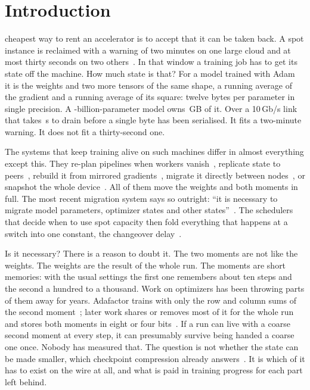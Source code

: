 \section{Introduction}
\label{sec:intro}

 cheapest way to rent an accelerator is to accept that it can be taken back. A spot instance is
reclaimed with a warning of two minutes on one large cloud and at most thirty seconds on two
others~\cite{wu2024cantbelate,lee2022spotlake}. In that window a training job has to get its state off the machine.
How much state is that? For a model trained with Adam~\cite{kingma2015adam,loshchilov2019adamw} it is the weights and
two more tensors of the same shape, a running average of the gradient and a running average of its square: twelve
bytes per parameter in single precision. A \llamaParams{}-billion-parameter model owns \llamaFullGB{}\,GB of it. Over
a 10\,Gb/s link that takes \llamaFullDrain{}\,s to drain before a single byte has been serialised. It fits a two-minute
warning. It does not fit a thirty-second one.

The systems that keep training alive on such machines differ in almost everything except this. They re-plan pipelines
when workers vanish~\cite{athlur2022varuna,thorpe2023bamboo,jang2023oobleck,duan2024parcae}, replicate state to
peers~\cite{wang2023gemini}, rebuild it from mirrored gradients~\cite{bhardwaj2025checkmate}, migrate it directly
between nodes~\cite{liu2026etc}, or snapshot the whole device~\cite{stoyanov2025criugpu,wei2025phoenixos}. All of them
move the weights and both moments in full. The most recent migration system says so outright: ``it is necessary to
migrate model parameters, optimizer states and other states''~\cite{liu2026etc}. The schedulers that decide when to
use spot capacity then fold everything that happens at a switch into one constant, the changeover
delay~\cite{wu2024cantbelate}.

Is it necessary? There is a reason to doubt it. The two moments are not like the weights. The weights are the result
of the whole run. The moments are short memories: with the usual settings the first one remembers about ten steps and
the second a hundred to a thousand. Work on optimizers has been throwing parts of them away for years. Adafactor
trains with only the row and column sums of the second moment~\cite{shazeer2018adafactor}; later work shares or
removes most of it for the whole run~\cite{zhang2025adammini,kalra2025slimadam} and stores both moments in eight or
four bits~\cite{dettmers2022eightbit,li2023fourbit}. If a run can live with a coarse second moment at every step, it
can presumably survive being handed a coarse one once. Nobody has measured that. The question is not whether the state
can be made smaller, which checkpoint compression already answers~\cite{li2024excp,zhang2026guarded}. It is which of
it has to exist on the wire at all, and what is paid in training progress for each part left behind.

